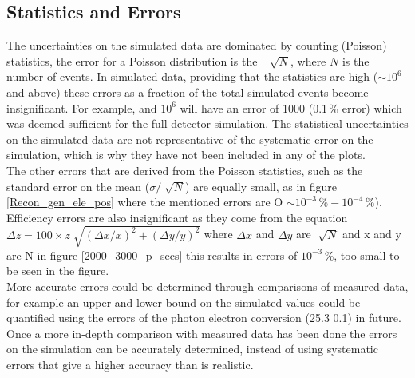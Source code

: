 \documentclass[12pt,a4paper]{article}
\begin{document}
\subsection{Statistics and Errors}
The uncertainties on the simulated data are dominated by counting (Poisson) statistics, the error for a Poisson distribution is the~ $\sqrt[]{N}$, where $N$ is the number of events. In simulated data, providing that the statistics are high ($\sim 10^6$ and above) these errors as a fraction of the total simulated events become insignificant. For example, and $10^6$ will have an error of 1000 (0.1\,\% error) which was deemed sufficient for the full detector simulation. The statistical uncertainties on the simulated data are not representative of the systematic error on the simulation, which is why they have not been included in any of the plots.\\

The other errors that are derived from the Poisson statistics, such as the standard error on the mean ($\sigma/\sqrt[]{N}$) are equally small, as in figure {\ref{Recon_gen_ele_pos}} where the mentioned errors are O $\sim 10^{-3}\,\% - 10^{-4}\,\%$). Efficiency errors are also insignificant as they come from the equation $\Delta z = 100 \times z \sqrt[]{(\Delta x / x)^2 + (\Delta y / y)^2}$ where $\Delta x$ and $\Delta y$ are $\sqrt[]{N}$ and x and y are N in figure {\ref{2000_3000_p_secs}} this results in errors of $10^{-3}$\,\%, too small to be seen in the figure.\\

More accurate errors could be determined through comparisons of measured data, for example an upper and lower bound on the simulated values could be quantified using the errors of the photon electron conversion (25.3\,\pm\,0.1) in future. Once a more in-depth comparison with measured data has been done the errors on the simulation can be accurately determined, instead of using systematic errors that give a higher accuracy than is realistic. 
\end{document}
